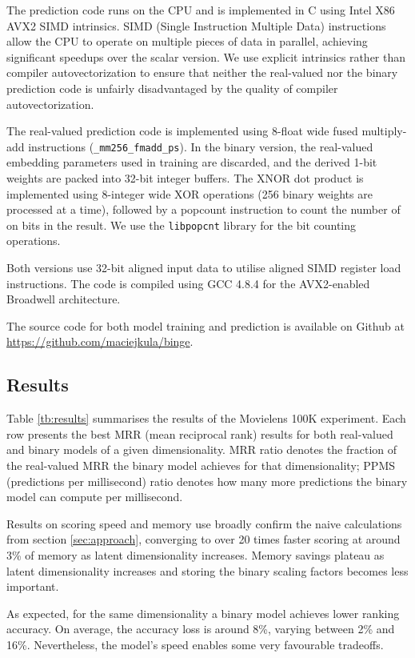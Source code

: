 \documentclass[sigchi]{acmart}
\begin{document}
The prediction code runs on the CPU and is implemented in C using Intel X86 AVX2 SIMD intrinsics. SIMD (Single Instruction Multiple Data) instructions allow the CPU to operate on multiple pieces of data in parallel, achieving significant speedups over the scalar version. We use explicit intrinsics rather than compiler autovectorization to ensure that neither the real-valued nor the binary prediction code is unfairly disadvantaged by the quality of compiler autovectorization. 

The real-valued prediction code is implemented using 8-float wide fused multiply-add instructions (\texttt{\_mm256\_fmadd\_ps}). In the binary version, the real-valued embedding parameters used in training are discarded, and the derived 1-bit weights are packed into 32-bit integer buffers. The XNOR dot product is implemented using 8-integer wide XOR operations (256 binary weights are processed at a time), followed by a popcount instruction to count the number of on bits in the result. We use the \texttt{libpopcnt} \citep{mula2016faster} library for the bit counting operations.

Both versions use 32-bit aligned input data to utilise aligned SIMD register load instructions. The code is compiled using GCC 4.8.4 for the AVX2-enabled Broadwell architecture.

The source code for both model training and prediction is available on Github at \url{https://github.com/maciejkula/binge}.

\subsection{Results}
\label{sec:results}
Table \ref{tb:results} summarises the results of the Movielens 100K experiment. Each row presents the best MRR (mean reciprocal rank) results for both real-valued and binary models of a given dimensionality. MRR ratio denotes the fraction of the real-valued MRR the binary model achieves for that dimensionality; PPMS (predictions per millisecond) ratio denotes how many more predictions the binary model can compute per millisecond.

Results on scoring speed and memory use broadly confirm the naive calculations from section \ref{sec:approach}, converging to over 20 times faster scoring at around 3\% of memory as latent dimensionality increases. Memory savings plateau as latent dimensionality increases and storing the binary scaling factors becomes less important.

As expected, for the same dimensionality a binary model achieves lower ranking accuracy. On average, the accuracy loss is around 8\%, varying between 2\% and 16\%.
Nevertheless, the model's speed enables some very favourable tradeoffs.
\end{document}
